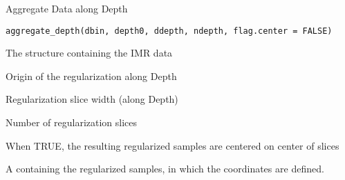 %
\begin{Description}\relax
Aggregate Data along Depth
\end{Description}
%
\begin{Usage}
\begin{verbatim}
aggregate_depth(dbin, depth0, ddepth, ndepth, flag.center = FALSE)
\end{verbatim}
\end{Usage}
%
\begin{Arguments}
\begin{ldescription}
\item[\code{dbin}] 
The  structure containing the IMR data

\item[\code{depth0}] 
Origin of the regularization along Depth

\item[\code{ddepth}] 
Regularization slice width (along Depth)

\item[\code{ndepth}] 
Number of regularization slices

\item[\code{flag.center}] 
When TRUE, the resulting regularized samples are centered on center
of slices

\end{ldescription}
\end{Arguments}
%
\begin{Value}
A  containing the regularized samples, in which the
coordinates are defined.
\end{Value}
